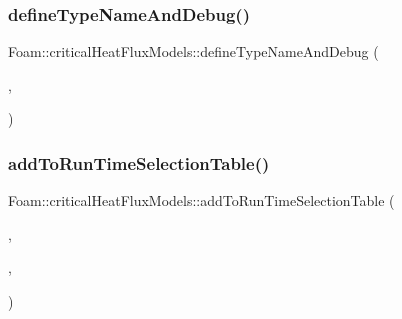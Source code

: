 \subsubsection{\texorpdfstring{define\+Type\+Name\+And\+Debug()}{defineTypeNameAndDebug()}\hspace{0.1cm}{\footnotesize\ttfamily [2/2]}}
{\footnotesize\ttfamily Foam\+::critical\+Heat\+Flux\+Models\+::define\+Type\+Name\+And\+Debug (\begin{DoxyParamCaption}\item[{\hyperlink{classFoam_1_1criticalHeatFluxModels_1_1lookUpTableCHF}{look\+Up\+Table\+C\+HF}}]{,  }\item[{0}]{ }\end{DoxyParamCaption})}

\mbox{\label{namespaceFoam_1_1criticalHeatFluxModels_a1aa2f47173f30829f9245afb6f02b073}} 
\subsubsection{\texorpdfstring{add\+To\+Run\+Time\+Selection\+Table()}{addToRunTimeSelectionTable()}\hspace{0.1cm}{\footnotesize\ttfamily [2/2]}}
{\footnotesize\ttfamily Foam\+::critical\+Heat\+Flux\+Models\+::add\+To\+Run\+Time\+Selection\+Table (\begin{DoxyParamCaption}\item[{\hyperlink{classFoam_1_1CHFModel}{C\+H\+F\+Model}}]{,  }\item[{\hyperlink{classFoam_1_1criticalHeatFluxModels_1_1lookUpTableCHF}{look\+Up\+Table\+C\+HF}}]{,  }\item[{critical\+Heat\+Flux\+Models}]{ }\end{DoxyParamCaption})}

